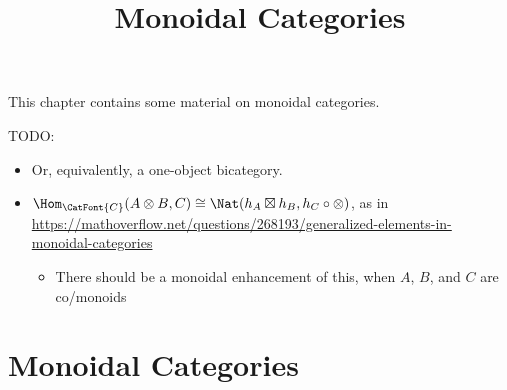 

%



\title{Monoidal Categories}

\maketitle

\label{section-phantom}

This chapter contains some material on monoidal categories.

\ChapterTableOfContents

TODO:
\begin{itemize}
    \item Or, equivalently, a one-object bicategory.
    \item $\Hom_{\CatFont{C}}(A\otimes B,C)\cong\Nat(h_{A}\boxtimes h_{B},h_{C}\circ\mathord{\otimes})$, as in \url{https://mathoverflow.net/questions/268193/generalized-elements-in-monoidal-categories}
        \begin{itemize}
            \item There should be a monoidal enhancement of this, when $A$, $B$, and $C$ are co/monoids
        \end{itemize}
\end{itemize}

\section{Monoidal Categories}\label{section-monoidal-categories}
